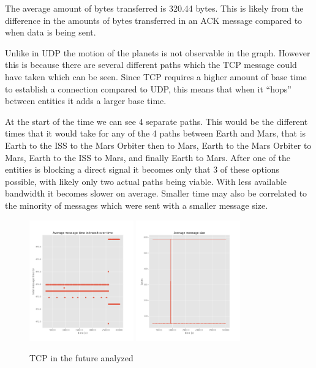 \documentclass[a4paper,12pt]{article}
\begin{document}
The average amount of bytes transferred is 320.44 bytes. This is likely from the
difference in the amounts of bytes transferred in an ACK message compared to
when data is being sent.

Unlike in UDP the motion of the planets is not observable in the graph. However
this is because there are several different paths which the TCP message could
have taken which can be seen. Since TCP requires a higher amount of base time to
establish a connection compared to UDP, this means that when it ``hops'' between
entities it adds a larger base time.

At the start of the time we can see 4 separate paths. This would be the
different times that it would take for any of the 4 paths between Earth and
Mars, that is Earth to the ISS to the Mars Orbiter then to Mars, Earth to the
Mars Orbiter to Mars, Earth to the ISS to Mars, and finally Earth to Mars. After
one of the entities is blocking a direct signal it becomes only that 3 of these
options possible, with likely only two actual paths being viable. With less
available bandwidth it becomes slower on average. Smaller time may also be
correlated to the minority of messages which were sent with a smaller message
size.

\begin{figure}[h]
  \centering
  \includegraphics[width=0.4\textwidth]{media/tcp_future.png}
  \includegraphics[width=0.4\textwidth]{media/tcp_future_data.png}
  \caption{TCP in the future analyzed}
\end{figure}
\end{document}

